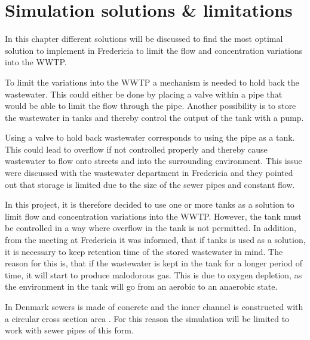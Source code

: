 
\chapter{Simulation solutions \& limitations }\label{ch:simulation_solution_and_limitation}
In this chapter different solutions will be discussed to find the most optimal solution to implement in Fredericia to limit the flow and concentration variations into the WWTP.

To limit the variations into the WWTP a mechanism is needed to hold back the wastewater. This could either be done by placing a valve within a pipe that would be able to limit the flow through the pipe.%
Another possibility is to store the wastewater in tanks and thereby control the output of the tank with a pump. 

Using a valve to hold back wastewater corresponds to using the pipe as a tank. This could lead to overflow if not controlled properly and thereby cause wastewater to flow onto streets and into the surrounding environment. %
This issue were discussed with the wastewater department in Fredericia and they pointed out that storage is limited due to the size of the sewer pipes and constant flow. 

In this project, it is therefore decided to use one or more tanks as a solution to limit flow and concentration variations into the WWTP. %
However, the tank must be controlled in a way where overflow in the tank is not permitted. %
In addition, from the meeting at Fredericia it was informed, that if tanks is used as a solution, it is necessary to keep retention time of the stored wastewater in mind. The reason for this is, that if the wastewater is kept in the tank for a longer period of time, it will start to produce malodorous gas. This is due to oxygen depletion, as the environment in the tank will go from an aerobic to an anaerobic state. 

In Denmark sewers is made of concrete and the inner channel is constructed with a circular cross section area \cite{betonhaandbogen}. For this reason the simulation will be limited to work with sewer pipes of this form.


